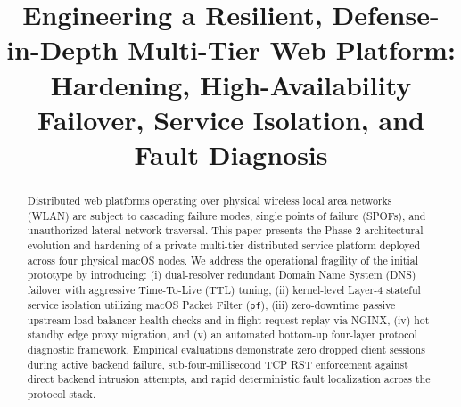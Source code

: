 \documentclass[conference]{IEEEtran}
\begin{document}
\title{Engineering a Resilient, Defense-in-Depth Multi-Tier Web Platform: Hardening, High-Availability Failover, Service Isolation, and Fault Diagnosis}

\author{
    \and
    \and
    \and
}

\maketitle

\begin{abstract}
Distributed web platforms operating over physical wireless local area networks (WLAN) are subject to cascading failure modes, single points of failure (SPOFs), and unauthorized lateral network traversal. This paper presents the Phase 2 architectural evolution and hardening of a private multi-tier distributed service platform deployed across four physical macOS nodes. We address the operational fragility of the initial prototype by introducing: (i) dual-resolver redundant Domain Name System (DNS) failover with aggressive Time-To-Live (TTL) tuning, (ii) kernel-level Layer-4 stateful service isolation utilizing macOS Packet Filter (\texttt{pf}), (iii) zero-downtime passive upstream load-balancer health checks and in-flight request replay via NGINX, (iv) hot-standby edge proxy migration, and (v) an automated bottom-up four-layer protocol diagnostic framework. Empirical evaluations demonstrate zero dropped client sessions during active backend failure, sub-four-millisecond TCP RST enforcement against direct backend intrusion attempts, and rapid deterministic fault localization across the protocol stack.
\end{abstract}
\end{document}

